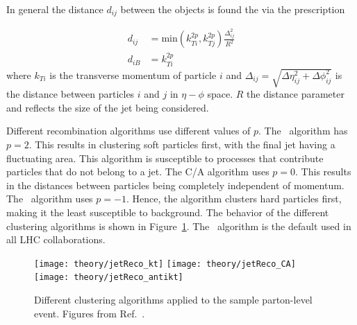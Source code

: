In general the distance $d_{ij}$ between the objects is found the via the prescription

\begin{align}
d_{ij} &= \mathrm{min} (k_{Ti}^{2p} , k_{Tj}^{2p}) \frac{\Delta_{ij}^2}{R^2}  \\
d_{iB} &= k_{Ti}^{2p}
\end{align}
where $k_{Ti}$ is the transverse momentum of particle $i$ and $\Delta_{ij} = \sqrt{\Delta\eta_{ij}^2 + \Delta\phi_{ij}^2}$ is the distance between particles $i$ and $j$ in $\eta-\phi$ space.
$R$ the distance parameter and reflects the size of the jet being considered.

Different recombination algorithms use different values of $p$. 
The \kt\ algorithm has $p = 2$.
This results in clustering soft particles first, with the final jet having a fluctuating area.
This algorithm is susceptible to processes that contribute particles that do not belong to a jet.
The C/A algorithm uses $p = 0$.
This results in the distances between particles being completely independent of momentum. 
The \antikt\ algorithm uses $p = -1$.
Hence, the algorithm clusters hard particles first, making it the least susceptible to background. 
The behavior of the different clustering algorithms is shown in Figure~\ref{fig:JetClustering}.
The \antikt\ algorithm is the default used in all LHC collaborations.

\begin{figure}[htp]
\centering
\texttt{[image: theory/jetReco\_kt]}\hfill
\texttt{[image: theory/jetReco\_CA]}\hfill
\texttt{[image: theory/jetReco\_antikt]}\hfill
\caption{Different clustering algorithms applied to the sample parton-level event.
Figures from Ref.~\cite{Cacciari:2008gp}.}
\label{fig:JetClustering}
\end{figure}



